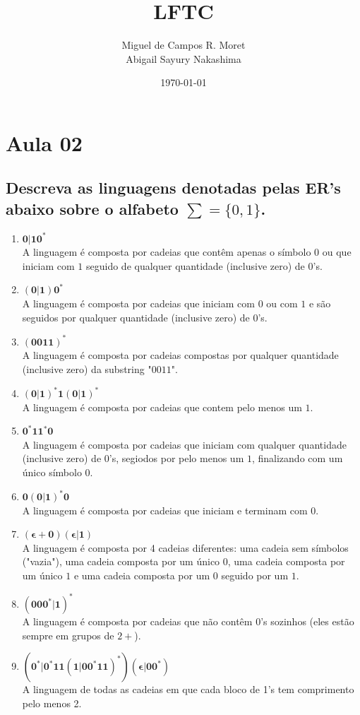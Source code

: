 \documentclass[a4paper,12pt]{article}
\title{LFTC}
\author{Miguel de Campos R. Moret \\ Abigail Sayury Nakashima}
\date{\today}
\begin{document}
\maketitle
\newpage

\section{Aula 02 }
    \subsection{Descreva as linguagens denotadas pelas ER’s abaixo sobre o alfabeto $\sum = \{0,1\}$.}
    \begin{enumerate}[label=\textbf{\alph* -}]
        \item $\mathbf{0|10^*}$
            \\ A linguagem é composta por cadeias que contêm apenas o símbolo $0$ ou que iniciam com $1$ seguido de qualquer quantidade (inclusive zero) de $0$'s.
        \item $\mathbf{(0|1)0^*}$
            \\ A linguagem é composta por cadeias que iniciam com $0$ ou com $1$ e são seguidos por qualquer quantidade (inclusive zero) de $0$'s.
        \item $\mathbf{(0011)^*}$
            \\ A linguagem é composta por cadeias compostas por qualquer quan\-tidade (inclusive zero) da substring "$0011$".
        \item $\mathbf{(0|1)^*1(0|1)^*}$
            \\ A linguagem é composta por cadeias que contem pelo menos um $1$.
        \item $\mathbf{0^*11^*0}$
            \\ A linguagem é composta por cadeias que iniciam com qualquer quan\-tidade (inclusive zero) de $0$'s, segiodos por pelo menos um $1$, finalizando com um único símbolo $0$.
        \item $\mathbf{0(0|1)^*0}$
            \\ A linguagem é composta por cadeias que iniciam e  terminam com $0$.
        \item $\mathbf{(\epsilon+0)(\epsilon|1)}$
            \\ A linguagem é composta por 4 cadeias diferentes: uma cadeia sem símbolos ("vazia"), uma cadeia composta por um único $0$, uma cadeia composta por um único $1$ e uma cadeia composta por um $0$ seguido por um $1$.
        \item $\mathbf{(000^*|1)^*}$
            \\ A linguagem é composta por cadeias que não contêm $0$'s sozinhos (eles estão sempre em grupos de $2+$).
        \item $\mathbf{(0^*|0^*11(1|00^*11)^*)(\epsilon|00^*)}$
            \\ A linguagem de todas as cadeias em que cada bloco de 1’s tem comprimento pelo menos 2.
    \end{enumerate}
\end{document}
